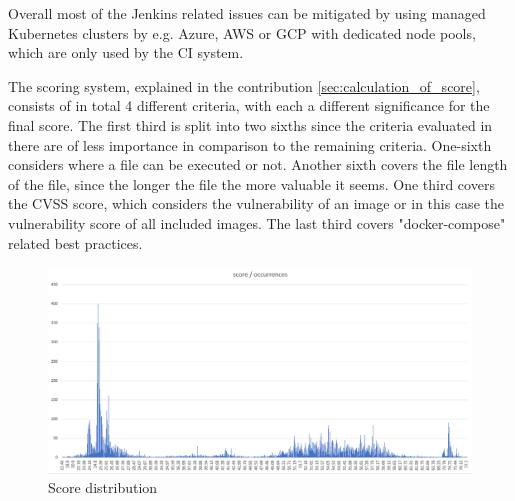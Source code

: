 Overall most of the Jenkins related issues can be mitigated by using managed Kubernetes clusters by e.g. Azure, AWS or GCP with dedicated node pools, which are only used by the CI system.

The scoring system, explained in the contribution \ref{sec:calculation_of_score}, consists of in total 4 different criteria, with each a different significance for the final score. The first third is split into two sixths since the criteria evaluated in there are of less importance in comparison to the remaining criteria. One-sixth considers where a file can be executed or not. Another sixth covers the file length of the file, since the longer the file the more valuable it seems. One third covers the CVSS score, which considers the vulnerability of an image or in this case the vulnerability score of all included images. The last third covers "docker-compose" related best practices.

\begin{figure}[H]
    \centering
    \includegraphics[scale=0.5]{graphics/deployment_score.png}
    \caption{Score distribution}
    \label{fig:deployment_score}
\end{figure}


